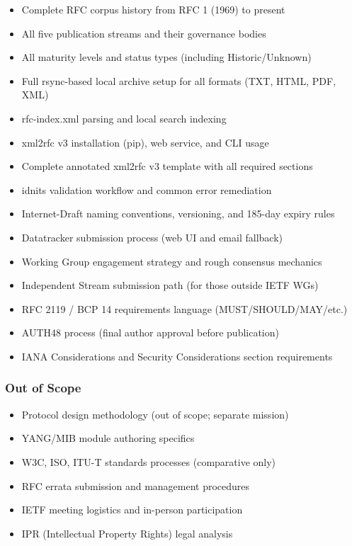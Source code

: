 \documentclass[11pt,letterpaper]{article}
\begin{document}
\begin{itemize}[noitemsep]
  \item Complete RFC corpus history from RFC 1 (1969) to present
  \item All five publication streams and their governance bodies
  \item All maturity levels and status types (including Historic/Unknown)
  \item Full rsync-based local archive setup for all formats (TXT, HTML, PDF, XML)
  \item rfc-index.xml parsing and local search indexing
  \item xml2rfc v3 installation (pip), web service, and CLI usage
  \item Complete annotated xml2rfc v3 template with all required sections
  \item idnits validation workflow and common error remediation
  \item Internet-Draft naming conventions, versioning, and 185-day expiry rules
  \item Datatracker submission process (web UI and email fallback)
  \item Working Group engagement strategy and rough consensus mechanics
  \item Independent Stream submission path (for those outside IETF WGs)
  \item RFC 2119 / BCP 14 requirements language (MUST/SHOULD/MAY/etc.)
  \item AUTH48 process (final author approval before publication)
  \item IANA Considerations and Security Considerations section requirements
\end{itemize}

\subsubsection{Out of Scope}

\begin{itemize}[noitemsep]
  \item Protocol design methodology (out of scope; separate mission)
  \item YANG/MIB module authoring specifics
  \item W3C, ISO, ITU-T standards processes (comparative only)
  \item RFC errata submission and management procedures
  \item IETF meeting logistics and in-person participation
  \item IPR (Intellectual Property Rights) legal analysis
\end{itemize}
\end{document}
